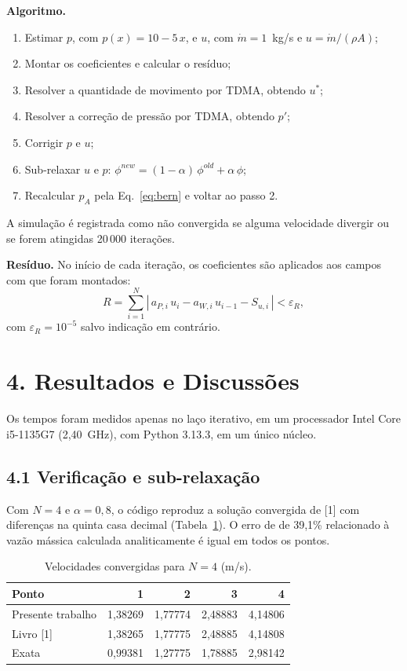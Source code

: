 \textbf{Algoritmo.}
\begin{enumerate}
  \setlength{\itemsep}{0pt}
  \item Estimar $p$, com $p(x)=10-5\,x$, e $u$, com $\dot m=1$~kg/s e
        $u=\dot m/(\rho A)$;
  \item Montar os coeficientes e calcular o resíduo;
  \item Resolver a quantidade de movimento por TDMA, obtendo $u^*$;
  \item Resolver a correção de pressão por TDMA, obtendo $p'$;
  \item Corrigir $p$ e $u$;
  \item Sub-relaxar $u$ e $p$: $\phi^{new}=(1-\alpha)\,\phi^{old}+\alpha\,\phi$;
  \item Recalcular $p_A$ pela Eq.~\eqref{eq:bern} e voltar ao passo 2.
\end{enumerate}
A simulação é registrada como não convergida se alguma velocidade divergir
ou se forem atingidas 20\,000 iterações.

\textbf{Resíduo.} No início de cada iteração, os coeficientes são
aplicados aos campos com que foram montados:
\begin{equation}
  R=\sum_{i=1}^{N}\left|\,a_{P,i}\,u_i-a_{W,i}\,u_{i-1}-S_{u,i}\,\right|
  <\varepsilon_R ,
\end{equation}
com $\varepsilon_R=10^{-5}$ salvo indicação em contrário.

\section*{4. Resultados e Discussões}

Os tempos foram medidos apenas no laço iterativo, em um processador Intel
Core i5-1135G7 (2,40~GHz), com Python 3.13.3, em um único núcleo.

\subsection*{4.1 Verificação e sub-relaxação}

Com $N=4$ e $\alpha=0{,}8$, o código reproduz a solução convergida de [1]
com diferenças na quinta casa decimal (Tabela~\ref{tab:livro}). O erro de
de 39,1\% relacionado à vazão mássica calculada analiticamente é igual em todos os pontos.

\begin{table}[H]
\centering
\caption{Velocidades convergidas para $N=4$ (m/s).}
\label{tab:livro}
\begin{tabular}{lrrrr}
\hline
Ponto & 1 & 2 & 3 & 4\\
\hline
Presente trabalho & 1,38269 & 1,77774 & 2,48883 & 4,14806\\
Livro [1]         & 1,38265 & 1,77775 & 2,48885 & 4,14808\\
Exata             & 0,99381 & 1,27775 & 1,78885 & 2,98142\\
\hline
\end{tabular}
\end{table}

